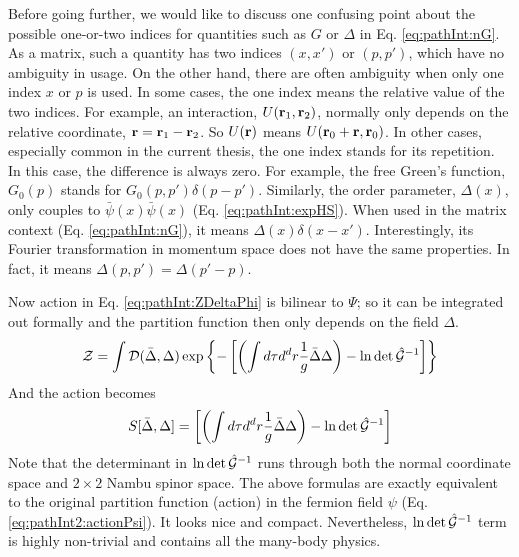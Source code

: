 Before going further, we would like to discuss one confusing point about the possible one-or-two indices for quantities such as ${G}$ or $\Delta$ in Eq. \ref{eq:pathInt:nG}.  As a matrix, such a quantity has two indices $(x,x')$ or $(p,p')$, which have no ambiguity in usage. On the other hand, there are often ambiguity when only one index $x$ or $p$ is used. In some cases, the one index means the relative value of the two indices. For example, an  interaction, $U(\mathbf{r}_{1},\mathbf{r}_{2})$, normally only depends on the relative coordinate, $\mathbf{r}=\mathbf{r}_{1}-\mathbf{r}_{2}$. So $U(\mathbf{r})$ means $U(\mathbf{r}_{0}+\mathbf{r},\mathbf{r}_{0})$.  In other cases, especially common in the current thesis, the one index stands for its repetition.  In this case, the difference is always zero. For example, the free Green's function, $G_{0}(p)$ stands for $G_{0}(p,p')\delta({p-p'})$.  Similarly,  the order parameter, $\Delta(x)$, only couples to $\bar\psi(x)\bar\psi(x)$ (Eq. \ref{eq:pathInt:expHS}).  When used in the matrix context (Eq. \ref{eq:pathInt:nG}), it means $\Delta(x)\delta(x-x')$. Interestingly, its Fourier transformation in momentum space does not have the same properties.  In fact, it means $\Delta(p,p')=\Delta(p'-p)$.

Now action in Eq. \ref{eq:pathInt:ZDeltaPhi} is bilinear to $\Psi$; so it can be integrated out formally and the partition function then only depends on the  field $\Delta$.  
\begin{equation}\label{eq:pathInt:DeltaPF}
\mathcal{Z}=\int{\ensuremath{\mathcal{D}}(\bar\Delta,\Delta)}\exp
	\left\{-\left[\left(\int{d\tau{d^{d}r}}\frac{1}{g}{\bar\Delta\Delta}\right)-\ln\det\hat{\mathcal{G}}^{-1}\right]\right\}
\end{equation}
And the action becomes
\begin{equation}\label{eq:pathInt:DeltaAction}
S[\bar\Delta,\Delta]=
	{\left[\left(\int{d\tau{d^{d}r}}\frac{1}{g}{\bar\Delta\Delta}\right)-\ln\det\hat{\mathcal{G}}^{-1}\right]}
\end{equation}
Note that the determinant in $\ln\det\hat{\mathcal{G}}^{-1}$ runs through both the normal coordinate space and $2\times2$ Nambu spinor space.  The above formulas are exactly equivalent to the original partition function (action) in the fermion field $\psi$ (Eq. \ref{eq:pathInt2:actionPsi}). It looks nice and compact. Nevertheless, $\ln\det\hat{\mathcal{G}}^{-1}$ term is highly non-trivial and contains all the many-body physics.

